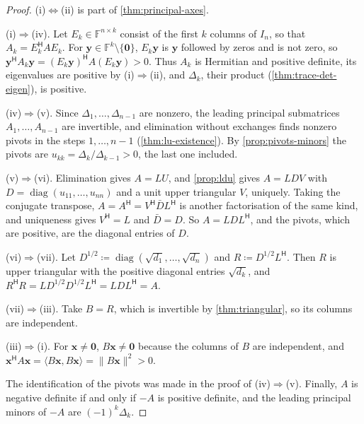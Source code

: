 \begin{proof}
(i)$\Leftrightarrow$(ii) is part of \cref{thm:principal-axes}.

(i)$\Rightarrow$(iv). Let $E_k\in\mathbb F^{n\times k}$ consist of the first $k$ columns of $I_n$, so that $A_k=E_k^{\mathsf H}AE_k$. For $\mathbf y\in\mathbb F^k\setminus\{\mathbf 0\}$, $E_k\mathbf y$ is $\mathbf y$ followed by zeros and is not zero, so $\mathbf y^{\mathsf H}A_k\mathbf y=(E_k\mathbf y)^{\mathsf H}A(E_k\mathbf y)>0$. Thus $A_k$ is Hermitian and positive definite, its eigenvalues are positive by (i)$\Rightarrow$(ii), and $\Delta_k$, their product (\cref{thm:trace-det-eigen}), is positive.

(iv)$\Rightarrow$(v). Since $\Delta_1,\ldots,\Delta_{n-1}$ are nonzero, the leading principal submatrices $A_1,\ldots,A_{n-1}$ are invertible, and elimination without exchanges finds nonzero pivots in the steps $1,\ldots,n-1$ (\cref{thm:lu-existence}). By \cref{prop:pivots-minors} the pivots are $u_{kk}=\Delta_k/\Delta_{k-1}>0$, the last one included.

(v)$\Rightarrow$(vi). Elimination gives $A=LU$, and \cref{prop:ldu} gives $A=LDV$ with $D=\operatorname{diag}(u_{11},\ldots,u_{nn})$ and a unit upper triangular $V$, uniquely. Taking the conjugate transpose, $A=A^{\mathsf H}=V^{\mathsf H}\bar DL^{\mathsf H}$ is another factorisation of the same kind, and uniqueness gives $V^{\mathsf H}=L$ and $\bar D=D$. So $A=LDL^{\mathsf H}$, and the pivots, which are positive, are the diagonal entries of $D$.

(vi)$\Rightarrow$(vii). Let $D^{1/2}\coloneqq\operatorname{diag}(\sqrt{d_1},\ldots,\sqrt{d_n})$ and $R\coloneqq D^{1/2}L^{\mathsf H}$. Then $R$ is upper triangular with the positive diagonal entries $\sqrt{d_k}$, and $R^{\mathsf H}R=LD^{1/2}D^{1/2}L^{\mathsf H}=LDL^{\mathsf H}=A$.

(vii)$\Rightarrow$(iii). Take $B=R$, which is invertible by \cref{thm:triangular}, so its columns are independent.

(iii)$\Rightarrow$(i). For $\mathbf x\ne\mathbf 0$, $B\mathbf x\ne\mathbf 0$ because the columns of $B$ are independent, and $\mathbf x^{\mathsf H}A\mathbf x=\langle B\mathbf x,B\mathbf x\rangle=\|B\mathbf x\|^2>0$.

The identification of the pivots was made in the proof of (iv)$\Rightarrow$(v). Finally, $A$ is negative definite if and only if $-A$ is positive definite, and the leading principal minors of $-A$ are $(-1)^k\Delta_k$.
\end{proof}

